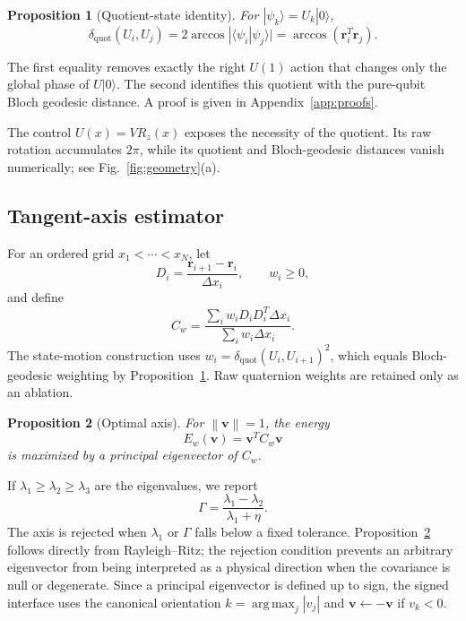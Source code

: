 \documentclass[a4paper,twocolumn,11pt,unpublished]{quantumarticle}
\newcommand{\ket}[1]{|#1\rangle}
\newcommand{\bloch}{\boldsymbol{r}}
\newcommand{\axis}{\boldsymbol{v}}
\newcommand{\norm}[1]{\left\lVert #1\right\rVert}
\newcommand{\argmaxop}{\operatorname*{arg\,max}}
\newtheorem{proposition}{Proposition}
\begin{document}
\begin{proposition}[Quotient-state identity]\label{prop:quotient}
For $\ket{\psi_k}=U_k\ket{0}$,
\begin{equation}
\delta_{\mathrm{quot}}(U_i,U_j)
=2\arccos|\langle\psi_i|\psi_j\rangle|
=\arccos(\bloch_i^T\bloch_j).
\end{equation}
\end{proposition}

The first equality removes exactly the right $U(1)$ action that changes only the global phase of $U\ket{0}$. The second identifies this quotient with the pure-qubit Bloch geodesic distance. A proof is given in Appendix~\ref{app:proofs}.

The control $U(x)=VR_z(x)$ exposes the necessity of the quotient. Its raw rotation accumulates $2\pi$, while its quotient and Bloch-geodesic distances vanish numerically; see Fig.~\ref{fig:geometry}(a).

\subsection{Tangent-axis estimator}

For an ordered grid $x_1<\cdots<x_N$, let
\begin{equation}
D_i=\frac{\bloch_{i+1}-\bloch_i}{\Delta x_i},
\qquad
w_i\geq0,
\end{equation}
and define
\begin{equation}
C_w=
\frac{\sum_iw_iD_iD_i^T\Delta x_i}
{\sum_iw_i\Delta x_i}.
\end{equation}
The state-motion construction uses $w_i=\delta_{\mathrm{quot}}(U_i,U_{i+1})^2$, which equals Bloch-geodesic weighting by Proposition~\ref{prop:quotient}. Raw quaternion weights are retained only as an ablation.

\begin{proposition}[Optimal axis]\label{prop:axis}
For $\norm{\axis}=1$, the energy
\begin{equation}
E_w(\axis)=\axis^TC_w\axis
\end{equation}
is maximized by a principal eigenvector of $C_w$.
\end{proposition}

If $\lambda_1\geq\lambda_2\geq\lambda_3$ are the eigenvalues, we report
\begin{equation}
\Gamma=\frac{\lambda_1-\lambda_2}{\lambda_1+\eta}.
\end{equation}
The axis is rejected when $\lambda_1$ or $\Gamma$ falls below a fixed tolerance. Proposition~\ref{prop:axis} follows directly from Rayleigh--Ritz; the rejection condition prevents an arbitrary eigenvector from being interpreted as a physical direction when the covariance is null or degenerate. Since a principal eigenvector is defined up to sign, the signed interface uses the canonical orientation $k=\argmaxop_j |v_j|$ and $\axis\leftarrow-\axis$ if $v_k<0$.
\end{document}

